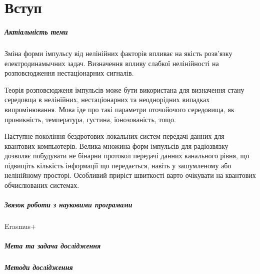 \chapter*{Вступ}

\paragraph{Актіальність теми}

Зміна форми імпульсу від нелінійних факторів впливає на якість розв'язку 
електродинамычних задач. Визначення впливу слабкої нелінійності на 
розповсюдження нестаціонарних сигналів.

Теорія розповсюдженя імпульсів може бути використана для визначення 
стану середовща в нелінійних, нестаціонарних та неоднорідних випадках
випромінювання. Мова іде про такі параметри оточойочого середовища, як 
проникність, температура, густина, іонозованість, тощо.


Наступне покоління бездротових локальних систем передачі данних для 
квантових компьютерів. Велика множина форм імпульсів для радіозвязку 
дозволяє побудувати не бінарни протокол передачі данних канального рівня,
що підвищіть кількість інформації що передається, навіть у зашумленому або 
нелінійному просторі. Особливий приріст швиткості варто очікувати на 
квантових обчислюваних системах.

\paragraph{Звязок роботи з науковими програмами}

Erasmus+

\paragraph{Мета та задача дослідження}

\paragraph{Методи дослідження}

